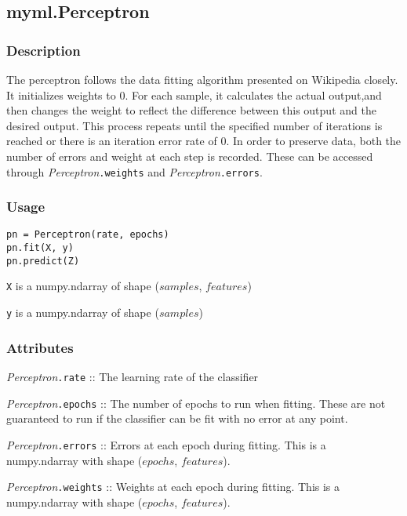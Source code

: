\documentclass{article}
\begin{document}
\subsection{myml.Perceptron}

\subsubsection{Description}

The perceptron follows the data fitting algorithm presented on Wikipedia
closely. It initializes weights to 0. For each sample, it calculates the actual
output,and then changes the weight to reflect the difference between this output
and the desired output. This process repeats until the specified number of
iterations is reached or there is an iteration error rate of 0. In order to
preserve data, both the number of errors and weight at each step is recorded.
These can be accessed through \textit{Perceptron}\texttt{.weights} and
\textit{Perceptron}\texttt{.errors}.

\subsubsection{Usage}

\begin{verbatim}
pn = Perceptron(rate, epochs)
pn.fit(X, y)
pn.predict(Z)
\end{verbatim}

\texttt{X} is a numpy.ndarray of shape ($samples$, $features$)

\texttt{y} is a numpy.ndarray of shape ($samples$)

\subsubsection{Attributes}

\textit{Perceptron}\texttt{.rate} :: The learning rate of the classifier

\textit{Perceptron}\texttt{.epochs} :: The number of epochs to run when fitting. These are not guaranteed to run if the classifier can be fit with no error at any point.

\textit{Perceptron}\texttt{.errors} :: Errors at each epoch during fitting. This is a numpy.ndarray with shape ($epochs$, $features$).

\textit{Perceptron}\texttt{.weights} :: Weights at each epoch during fitting. This is a numpy.ndarray with shape ($epochs$, $features$).
\end{document}
